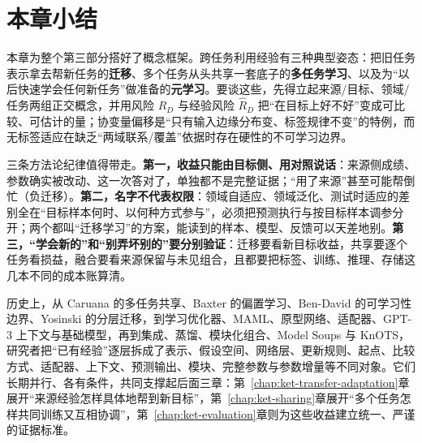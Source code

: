 \section{本章小结}
\label{sec:kts-overview-summary}

本章为整个第三部分搭好了概念框架。跨任务利用经验有三种典型姿态：把旧任务表示拿去帮新任务的\textbf{迁移}、多个任务从头共享一套底子的\textbf{多任务学习}、以及为“以后快速学会任何新任务”做准备的\textbf{元学习}。要谈这些，先得立起来源/目标、领域/任务两组正交概念，并用风险 $R_D$ 与经验风险 $\hat R_D$ 把“在目标上好不好”变成可比较、可估计的量；协变量偏移是“只有输入边缘分布变、标签规律不变”的特例，而无标签适应在缺乏“两域联系/覆盖”依据时存在硬性的不可学习边界。

三条方法论纪律值得带走。\textbf{第一，收益只能由目标侧、用对照说话}：来源侧成绩、参数确实被改动、这一次答对了，单独都不是完整证据；“用了来源”甚至可能帮倒忙（负迁移）。\textbf{第二，名字不代表权限}：领域自适应、领域泛化、测试时适应的差别全在“目标样本何时、以何种方式参与”，必须把预测执行与按目标样本调参分开；两个都叫“迁移学习”的方案，能读到的样本、模型、反馈可以天差地别。\textbf{第三，“学会新的”和“别弄坏别的”要分别验证}：迁移要看新目标收益，共享要逐个任务看损益，融合要看来源保留与未见组合，且都要把标签、训练、推理、存储这几本不同的成本账算清。

历史上，从 Caruana 的多任务共享、Baxter 的偏置学习、Ben-David 的可学习性边界、Yosinski 的分层迁移，到学习优化器、MAML、原型网络、适配器、GPT-3 上下文与基础模型，再到集成、蒸馏、模块化组合、Model Soups 与 KnOTS，研究者把“已有经验”逐层拆成了表示、假设空间、网络层、更新规则、起点、比较方式、适配器、上下文、预测输出、模块、完整参数与参数增量等不同对象。它们长期并行、各有条件，共同支撑起后面三章：第~\ref{chap:ket-transfer-adaptation}章展开“来源经验怎样具体地帮到新目标”，第~\ref{chap:ket-sharing}章展开“多个任务怎样共同训练又互相协调”，第~\ref{chap:ket-evaluation}章则为这些收益建立统一、严谨的证据标准。
